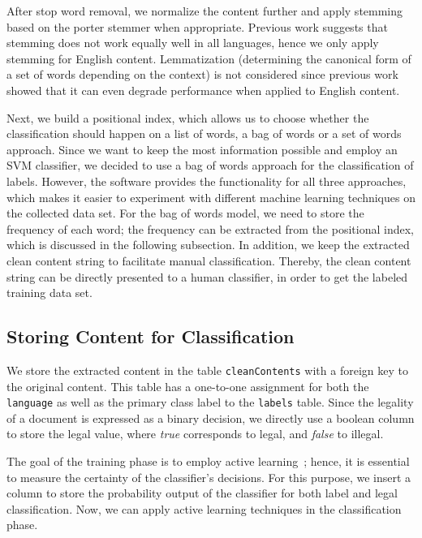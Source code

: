 \documentclass[USenglish,oneside,twocolumn]{article}
\begin{document}
After stop word removal, we normalize the content further and apply stemming \cite{WormerStemmer} based on the porter stemmer \cite{porter1980algorithm} when appropriate. Previous work \cite{Harman1991, hull1996stemming, krovetz1996word,SaltonTextProcessing} suggests that stemming does not work equally well in all languages, hence we only apply stemming for English content. Lemmatization (determining the canonical form of a set of words depending on the context) is not considered since previous work showed that it can even degrade performance when applied to English content.

Next, we build a positional index, which allows us to choose whether the classification should happen on a list of words, a bag of words or a set of words approach. Since we want to keep the most information possible and employ an SVM classifier, we decided to use a bag of words approach for the classification of labels. However, the software provides the functionality for all three approaches, which makes it easier to experiment with different machine learning techniques on the collected data set. For the bag of words model, we need to store the frequency of each word; the frequency can be extracted from the positional index, which is discussed in the following subsection. 
In addition, we keep the extracted clean content string to facilitate manual classification. Thereby, the clean content string can be directly presented to a human classifier, in order to get the labeled training data set.
%
%
\subsection{Storing Content for Classification}
We store the extracted content in the table \texttt{cleanContents} with a foreign key to the original content. This table has a one-to-one assignment for both the \texttt{language} as well as the primary class label to the \texttt{labels} table. Since the legality of a document is expressed as a binary decision, we directly use a boolean column to store the legal value, where \emph{true} corresponds to legal, and \emph{false} to illegal.

The goal of the training phase is to employ active learning~\cite{Xu2009}; hence, it is essential to measure the certainty of the classifier's decisions. For this purpose, we insert a column to store the probability output of the classifier for both label and legal classification. Now, we can apply active learning techniques in the classification phase.
\end{document}
